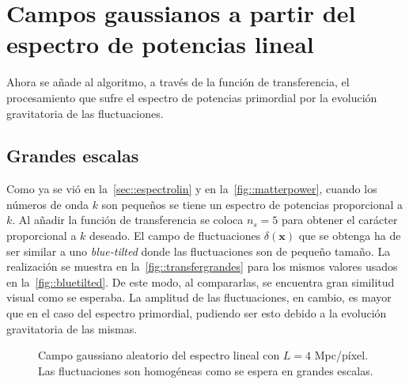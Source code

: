 \section{Campos gaussianos a partir del espectro de potencias lineal}
Ahora se añade al algoritmo, a través de la función de transferencia, el procesamiento que sufre el espectro de potencias primordial por la evolución gravitatoria de las fluctuaciones.
\subsection{Grandes escalas}
Como ya se vió en la~\autoref{sec::espectrolin} y en la~\autoref{fig::matterpower}, cuando los números de onda \(k\) son pequeños se tiene un espectro de potencias proporcional a \(k\). Al añadir la función de transferencia se coloca \(n_s=5\) para obtener el carácter proporcional a \(k\) deseado. El campo de fluctuaciones \(\delta(\symbf{x})\) que se obtenga ha de ser similar a uno \textit{blue-tilted} donde las fluctuaciones son de pequeño tamaño. La realización se muestra en la~\autoref{fig::transfergrandes} para los mismos valores usados en la~\autoref{fig::bluetilted}. De este modo, al compararlas, se encuentra gran similitud visual como se esperaba. La amplitud de las fluctuaciones, en cambio, es mayor que en el caso del espectro primordial, pudiendo ser esto debido a la evolución gravitatoria de las mismas.
\begin{figure}[ht]
    \centering
    \scalebox{.85}{}
    \caption[Espectro lineal \(N=256\) píxeles y \(L=4\) Mpc/píxel]{Campo gaussiano aleatorio del espectro lineal con \(L=4\) Mpc/píxel. Las fluctuaciones son homogéneas como se espera en grandes escalas.}
    \label{fig::transfergrandes}
\end{figure}
\clearpage
